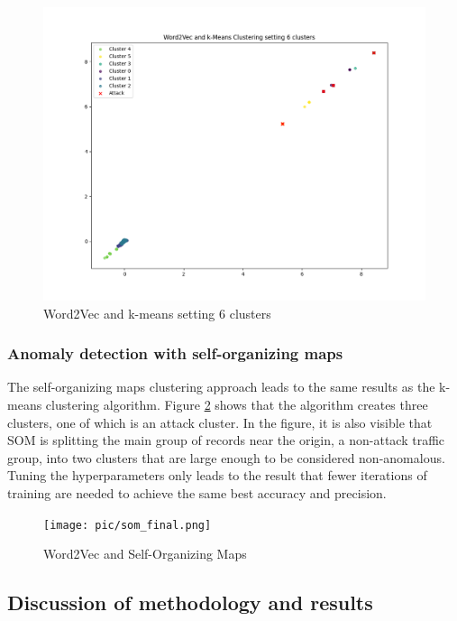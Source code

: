 \documentclass[
    fontsize=12pt,
    headings=small,
    parskip=half,           %
    bibliography=totoc,
    numbers=noenddot,       %
    open=any,               %
    ]{scrreprt}
\begin{document}
\begin{figure}[H]
	\caption{Word2Vec and k-means setting 6 clusters}
	\label{fig:kmeans_clusters_6}
	\sffamily\footnotesize
	\includegraphics[width=1\textwidth]{pic/k_means_6.png}
	\unitlength=0.75mm
	\linethickness{0.4pt}
\end{figure}

\subsubsection{Anomaly detection with self-organizing maps}
The self-organizing maps clustering approach leads to the same results as the k-means clustering algorithm. Figure \ref{fig:som_clusters} shows that the algorithm creates three clusters, one of which is an attack cluster. In the figure, it is also visible that SOM is splitting the main group of records near the origin, a non-attack traffic group, into two clusters that are large enough to be considered non-anomalous. Tuning the hyperparameters only leads to the result that fewer iterations of training are needed to achieve the same best accuracy and precision. 



\begin{figure}[H]
	\caption{Word2Vec and Self-Organizing Maps}
	\label{fig:som_clusters}
	\sffamily\footnotesize
	\texttt{[image: pic/som\_final.png]}
	\unitlength=0.75mm
	\linethickness{0.4pt}
\end{figure}


\subsection{Discussion of methodology and results}
\label{subsec:results_discussion}
\end{document}
